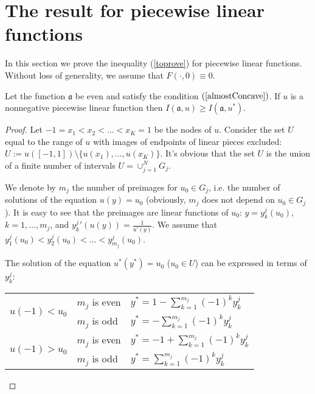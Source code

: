 \section{The result for piecewise linear functions}

\rm
In this section we prove the inequality (\ref{toprove}) for piecewise linear functions.
Without loss of generality, we assume that $F(\cdot, 0) \equiv 0$.

\begin{thm}
\label{linth}
Let the function $\mathfrak a$ be even and satisfy the condition $(\ref{almostConcave})$.
If $u$ is a nonnegative piecewise linear function then $I(\mathfrak a, u) \ge I(\mathfrak a, u^*)$.
\end{thm}

\begin{proof}
Let $-1 = x_1 < x_2 < \dots < x_K = 1$ be the nodes of $u$.
Consider the set $U$ equal to the range of $u$ with images of endpoints of linear pieces excluded:
$U := u( [-1, 1] ) \setminus \{ u(x_1), \dots, u(x_K) \}$.
It's obvious that the set $U$ is the union of a finite number of intervals $U = \cup_{j = 1}^N G_j$.

We denote by $m_j$ the number of preimages for $u_0 \in G_j$,
i.e. the number of solutions of the equation $u(y) = u_0$
(obviously, $m_j$ does not depend on $u_0 \in G_j$).
It is easy to see that the preimages are linear functions of $u_0$:
$y = y_k^j(u_0)$, $k = 1, \dots, m_j$,
and $y_k^j{}'(u(y)) = \frac{1}{u'(y)}$.
We assume that $y_1^j(u_0) < y_2^j(u_0) < \dots < y_{m_j}^j(u_0)$.

The solution of the equation $u^*(y^*)=u_0$ ($u_0 \in U$) can be expressed in terms of $y_k^j$:

\begin{center}
\begin{tabular}{l|l|l} 
\multirow{2}{*}{$u(-1)<u_0$ \rule[-34pt]{0pt}{65pt}} & $m_j$ is even & $y^*=1-\sum\limits_{k=1}^{m_j} (-1)^k y_k^j$ \rule[-17pt]{0pt}{40pt} \\
                                                     & $m_j$ is odd  & $y^*=-\sum\limits_{k=1}^{m_j} (-1)^k y_k^j$ \rule[-17pt]{0pt}{40pt} \\ \hline
\multirow{2}{*}{$u(-1)>u_0$ \rule[-34pt]{0pt}{65pt}} & $m_j$ is even & $y^*=-1+\sum\limits_{k=1}^{m_j} (-1)^k y_k^j$ \rule[-17pt]{0pt}{40pt} \\
                                                     & $m_j$ is odd  & $y^*=\sum\limits_{k=1}^{m_j} (-1)^k y_k^j$ \rule[-17pt]{0pt}{40pt} \\ 
\end{tabular}
\end{center}


\end{proof}
